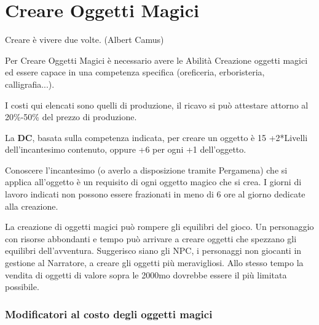 \section{Creare Oggetti Magici}

\begin{changemargin}{0.3cm}{0.3cm}\begin{enfasi}{
\begin{center}
Creare è vivere due volte. (Albert Camus)
\end{center}
}\end{enfasi}\end{changemargin}\medskip

\begin{multicols}{2}

\label{creare-oggetti-magici}

Per Creare Oggetti Magici è necessario avere le Abilità Creazione oggetti magici ed essere capace in una competenza specifica (oreficeria, erboristeria, calligrafia...).

I costi qui elencati sono quelli di produzione, il ricavo si può attestare attorno al 20\%-50\% del prezzo di produzione.

La \textbf{DC}, basata sulla competenza indicata, per creare un oggetto è 15 +2*Livelli dell'incantesimo contenuto, oppure +6 per ogni +1 dell'oggetto.

Conoscere l'incantesimo (o averlo a disposizione tramite Pergamena) che si applica all'oggetto è un requisito di ogni oggetto magico che si crea. I giorni di lavoro indicati non possono essere frazionati in meno di 6 ore al giorno dedicate alla creazione.

\begin{changemargin}{0.3cm}{0.3cm}\begin{narratore}
La creazione di oggetti magici può rompere gli equilibri del gioco. Un personaggio con risorse abbondanti e tempo può arrivare a creare oggetti che spezzano gli equilibri dell'avventura. Suggerisco siano gli NPC, i personaggi non giocanti in gestione al Narratore, a creare gli oggetti più meravigliosi. Allo stesso tempo la vendita di oggetti di valore sopra le 2000mo dovrebbe essere il più limitata possibile.
\end{narratore}\end{changemargin}

\subsubsection{Modificatori al costo degli oggetti magici}\label{modificatoricostooggettimagici}


\end{multicols}
